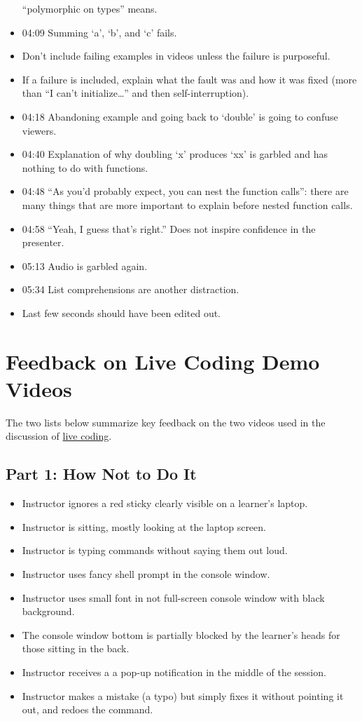 \documentclass[10pt,statementpaper]{memoir}
\begin{document}
\begin{itemize}
  ``polymorphic on types'' means.
\item
  04:09 Summing `a', `b', and `c' fails.
\item
  Don't include failing examples in videos unless the failure is
  purposeful.
\item
  If a failure is included, explain what the fault was and how it was
  fixed (more than ``I can't initialize\ldots{}'' and then
  self-interruption).
\item
  04:18 Abandoning example and going back to `double' is going to
  confuse viewers.
\item
  04:40 Explanation of why doubling `x' produces `xx' is garbled and has
  nothing to do with functions.
\item
  04:48 ``As you'd probably expect, you can nest the function calls'':
  there are many things that are more important to explain before nested
  function calls.
\item
  04:58 ``Yeah, I guess that's right.'' Does not inspire confidence in
  the presenter.
\item
  05:13 Audio is garbled again.
\item
  05:34 List comprehensions are another distraction.
\item
  Last few seconds should have been edited out.
\end{itemize}

\section{Feedback on Live Coding Demo
Videos}\label{feedback-on-live-coding-demo-videos}

The two lists below summarize key feedback on the two videos used in the
discussion of \href{live.html}{live coding}.

\subsection{Part 1: How Not to Do It}\label{part-1-how-not-to-do-it}

\begin{itemize}
\item
  Instructor ignores a red sticky clearly visible on a learner's laptop.
\item
  Instructor is sitting, mostly looking at the laptop screen.
\item
  Instructor is typing commands without saying them out loud.
\item
  Instructor uses fancy shell prompt in the console window.
\item
  Instructor uses small font in not full-screen console window with
  black background.
\item
  The console window bottom is partially blocked by the learner's heads
  for those sitting in the back.
\item
  Instructor receives a a pop-up notification in the middle of the
  session.
\item
  Instructor makes a mistake (a typo) but simply fixes it without
  pointing it out, and redoes the command.
\end{itemize}
\end{document}
